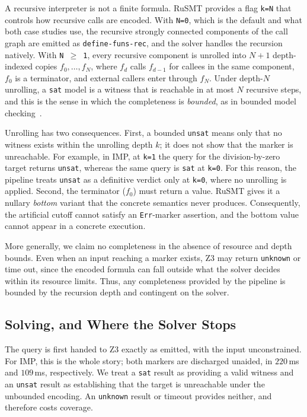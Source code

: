 \documentclass[sigconf,screen]{acmart}
\theoremstyle{definition}
\theoremstyle{remark}
\newcommand{\rusmt}{RuSMT}
\newcommand{\imp}{IMP}
\newcommand{\code}[1]{\texttt{#1}}
\begin{document}
A recursive interpreter is not a finite formula. \rusmt{} provides a flag \code{k=N} that controls how recursive calls are encoded. With \code{N=0}, which is the default and what both case
studies use, the recursive strongly connected components of the call graph are
emitted as \code{define-funs-rec}, and the solver handles the recursion
natively. With \code{N\,$\geq$\,1}, every recursive component is unrolled into
$N{+}1$ depth-indexed copies $f_0, \ldots, f_N$, where $f_d$ calls $f_{d-1}$ for
callees in the same component, $f_0$ is a terminator, and external callers enter
through $f_N$. Under depth-$N$ unrolling, a \code{sat} model is a witness that
is reachable in at most $N$ recursive steps, and this is the sense in which the
completeness is \emph{bounded}, as in bounded model
checking~\cite{biere1999bmc}.

Unrolling has two consequences. First, a bounded \code{unsat} means only that no witness exists within the unrolling depth $k$; it does not show that the marker is unreachable. For example, in \imp{}, at \code{k=1} the query for the division-by-zero target returns \code{unsat}, whereas the same query is \code{sat} at \code{k=0}. For this reason, the pipeline treats \code{unsat} as a definitive verdict only at \code{k=0}, where no unrolling is applied. Second, the terminator ($f_0$) must return a value. \rusmt{} gives it a nullary \emph{bottom} variant that the concrete semantics never produces. Consequently, the artificial cutoff cannot satisfy an \code{Err}-marker assertion, and the bottom value cannot appear in a concrete execution.

More generally, we claim no completeness in the absence of resource and depth bounds. Even when an input reaching a marker exists, Z3 may return \code{unknown} or time out, since the encoded formula can fall outside what the solver decides within its resource limits. Thus, any completeness provided by the pipeline is bounded by the recursion depth and contingent on the solver.

\subsection{Solving, and Where the Solver Stops}
\label{sec:stages}

The query is first handed to Z3 exactly as emitted, with the input
unconstrained. For \imp{}, this is the whole story; both markers are discharged
unaided, in $220$\,ms and $109$\,ms, respectively. We treat a \code{sat} result as providing a valid witness and an \code{unsat} result as establishing that the target is unreachable under the unbounded encoding. An \code{unknown} result or timeout provides neither, and therefore costs coverage.
\end{document}
